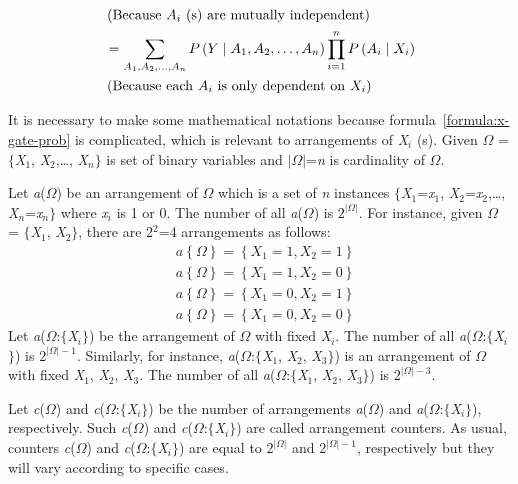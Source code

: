\documentclass{article}
\numberwithin{equation}{section}
\numberwithin{figure}{section}
\numberwithin{table}{section}
\begin{document}
\begin{align*}
&\left(\mathrm{Because}\ A_i\ \mathrm{(s)}\ \mathrm{are\ mutually\ independent}\right)\\
&=\sum_{A_1,A_2,\dots ,A_n}{P\left(Y\mathrel{\left|\vphantom{Y A_1,A_2,\dots ,A_n}\right.\kern-\nulldelimiterspace}A_1,A_2,\dots ,A_n\right)\prod^n_{i=1}{P\left(A_i\mathrel{\left|\vphantom{A_i X_i}\right.\kern-\nulldelimiterspace}X_i\right)}}\\
&\left(\mathrm{Because}\ \mathrm{each}\ A_i\ \mathrm{is\ only\ dependent\ on}\ X_i\right)
\end{align*}

It is necessary to make some mathematical notations because formula~\ref{formula:x-gate-prob} is complicated, which is relevant to arrangements of \textit{X${}_{i}$} (s). Given $\Omega$ = $\{$\textit{X}${}_{1}$, \textit{X}${}_{2}$,{\dots}, \textit{X${}_{n}$}$\}$ is set of binary variables and $|\Omega|$=\textit{n} is cardinality of $\Omega$.

Let \textit{a}($\Omega$) be an arrangement of $\Omega$ which is a set of \textit{n} instances $\{$\textit{X}${}_{1}$=\textit{x}${}_{1}$, \textit{X}${}_{2}$=\textit{x}${}_{2}$,{\dots}, \textit{X${}_{n}$}=\textit{x${}_{n}$}$\}$ where \textit{x${}_{i}$} is 1 or 0. The number of all \textit{a}($\Omega$) is $2^{|\Omega|}$. For instance, given $\Omega$ = $\{$\textit{X}${}_{1}$, \textit{X}${}_{2}$$\}$, there are 2${}^{2}$=4 arrangements as follows:
\begin{align*}
&a\left\{\Omega\right\}=\left\{X_1=1,X_2=1\right\}\\
&a\left\{\Omega\right\}=\left\{X_1=1,X_2=0\right\}\\
&a\left\{\Omega\right\}=\left\{X_1=0,X_2=1\right\}\\
&a\left\{\Omega\right\}=\left\{X_1=0,X_2=0\right\}
\end{align*}
Let \textit{a}($\Omega$:$\{$\textit{X${}_{i}$}$\}$) be the arrangement of $\Omega$ with fixed \textit{X${}_{i}$}. The number of all \textit{a}($\Omega$:$\{$\textit{X${}_{i}$}$\}$) is $2^{|\Omega|-1}$. Similarly, for instance, \textit{a}($\Omega$:$\{$\textit{X}${}_{1}$, \textit{X}${}_{2}$, \textit{X}${}_{3}$$\}$) is an arrangement of $\Omega$ with fixed \textit{X}${}_{1}$, \textit{X}${}_{2}$, \textit{X}${}_{3}$. The number of all \textit{a}($\Omega$:$\{$\textit{X}${}_{1}$, \textit{X}${}_{2}$, \textit{X}${}_{3}$$\}$) is $2^{|\Omega|-3}$.

Let \textit{c}($\Omega$) and \textit{c}($\Omega$:$\{$\textit{X${}_{i}$}$\}$) be the number of arrangements \textit{a}($\Omega$) and \textit{a}($\Omega$:$\{$\textit{X${}_{i}$}$\}$), respectively. Such \textit{c}($\Omega$) and \textit{c}($\Omega$:$\{$\textit{X${}_{i}$}$\}$) are called arrangement counters. As usual, counters \textit{c}($\Omega$) and \textit{c}($\Omega$:$\{$\textit{X${}_{i}$}$\}$) are equal to $2^{|\Omega|}$ and $2^{|\Omega|-1}$, respectively but they will vary according to specific cases.
\end{document}
